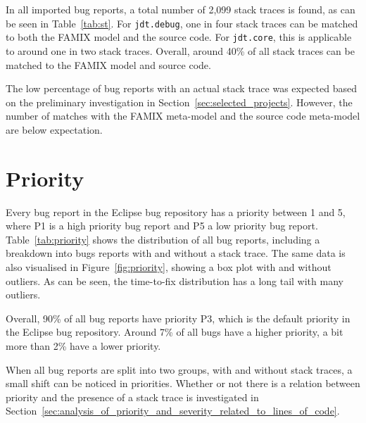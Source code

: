 In all imported bug reports, a total number of 2,099 stack traces is found, as can be seen in Table~\ref{tab:st}. For \texttt{jdt.debug}, one in four stack traces can be matched to both the FAMIX model and the source code. For \texttt{jdt.core}, this is applicable to around one in two stack traces. Overall, around 40\% of all stack traces can be matched to the FAMIX model and source code.

The low percentage of bug reports with an actual stack trace was expected based on the preliminary investigation in Section~\ref{sec:selected_projects}. However, the number of matches with the FAMIX meta-model and the source code meta-model are below expectation.

\section{Priority} %
\label{sec:priority}
Every bug report in the Eclipse bug repository has a priority between 1 and 5, where P1 is a high priority bug report and P5 a low priority bug report. Table~\ref{tab:priority} shows the distribution of all bug reports, including a breakdown into bugs reports with and without a stack trace. The same data is also visualised in Figure~\ref{fig:priority}, showing a box plot with and without outliers. As can be seen, the time-to-fix distribution has a long tail with many outliers.

Overall, 90\% of all bug reports have priority P3, which is the default priority in the Eclipse bug repository. Around 7\% of all bugs have a higher priority, a bit more than 2\% have a lower priority. 

When all bug reports are split into two groups, with and without stack traces, a small shift can be noticed in priorities. Whether or not there is a relation between priority and the presence of a stack trace is investigated in Section~\ref{sec:analysis_of_priority_and_severity_related_to_lines_of_code}.

